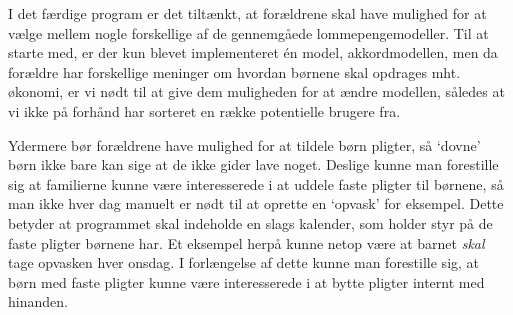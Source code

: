 I det færdige program er det tiltænkt, at forældrene skal have mulighed for at vælge mellem nogle forskellige af de gennemgåede lommepengemodeller. Til at starte med, er der kun blevet implementeret én model, akkordmodellen, men da forældre har forskellige meninger om hvordan børnene skal opdrages mht. økonomi, er vi nødt til at give dem muligheden for at ændre modellen, således at vi ikke på forhånd har sorteret en række potentielle brugere fra.

Ydermere bør forældrene have mulighed for at tildele børn pligter, så ‘dovne’ børn ikke bare kan sige at de ikke gider lave noget. Deslige kunne man forestille sig at familierne kunne være interesserede i at uddele faste pligter til børnene, så man ikke hver dag manuelt er nødt til at oprette en ‘opvask’ for eksempel. Dette betyder at programmet skal indeholde en slags kalender, som holder styr på de faste pligter børnene har. Et eksempel herpå kunne netop være at barnet \textit{skal} tage opvasken hver onsdag. I forlængelse af dette kunne man forestille sig, at børn med faste pligter kunne være interesserede i at bytte pligter internt med hinanden.